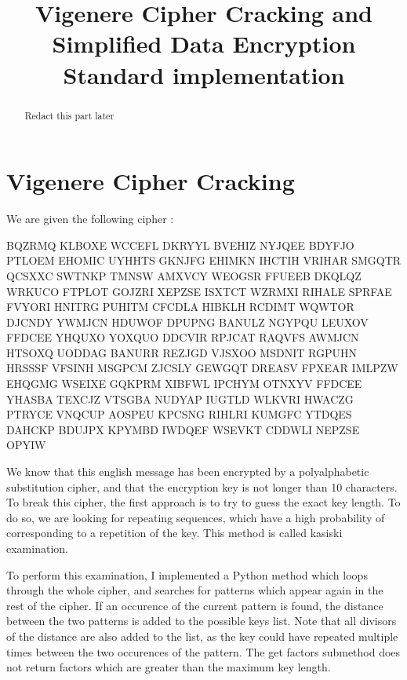 \documentclass{article}
\title{\textbf{Vigenere Cipher Cracking and Simplified Data Encryption Standard implementation}}
\author{}
\date{}
\begin{document}
\maketitle \thispagestyle{fancy}

\begin{abstract}
    Redact this part later
    
\end{abstract}

\section{Vigenere Cipher Cracking}

    We are given the following cipher :

    \begin{python}
        BQZRMQ KLBOXE WCCEFL DKRYYL BVEHIZ NYJQEE BDYFJO PTLOEM EHOMIC
        UYHHTS GKNJFG EHIMKN IHCTIH VRIHAR SMGQTR QCSXXC SWTNKP TMNSW
        AMXVCY WEOGSR FFUEEB DKQLQZ WRKUCO FTPLOT GOJZRI XEPZSE ISXTCT
        WZRMXI RIHALE SPRFAE FVYORI HNITRG PUHITM CFCDLA HIBKLH RCDIMT
        WQWTOR DJCNDY YWMJCN HDUWOF DPUPNG BANULZ NGYPQU LEUXOV FFDCEE
        YHQUXO YOXQUO DDCVIR RPJCAT RAQVFS AWMJCN HTSOXQ UODDAG BANURR
        REZJGD VJSXOO MSDNIT RGPUHN HRSSSF VFSINH MSGPCM ZJCSLY GEWGQT
        DREASV FPXEAR IMLPZW EHQGMG WSEIXE GQKPRM XIBFWL IPCHYM OTNXYV
        FFDCEE YHASBA TEXCJZ VTSGBA NUDYAP IUGTLD WLKVRI HWACZG PTRYCE
        VNQCUP AOSPEU KPCSNG RIHLRI KUMGFC YTDQES DAHCKP BDUJPX KPYMBD
        IWDQEF WSEVKT CDDWLI NEPZSE OPYIW
    \end{python}

    We know that this english message has been encrypted by a polyalphabetic substitution cipher, and that the encryption key is not longer than 10 characters. To break this cipher, the first approach is to try to guess the exact key length. To do so, we are looking for repeating sequences, which have a high probability of corresponding to a repetition of the key. This method is called kasiski examination.\cite{vigenere}

    To perform this examination, I implemented a Python method which loops through the whole cipher, and searches for patterns which appear again in the rest of the cipher. If an occurence of the current pattern is found, the distance between the two patterns is added to the possible keys list. Note that all divisors of the distance are also added to the list, as the key could have repeated multiple times between the two occurences of the pattern. The get factors submethod does not return factors which are greater than the maximum key length.
\end{document}
